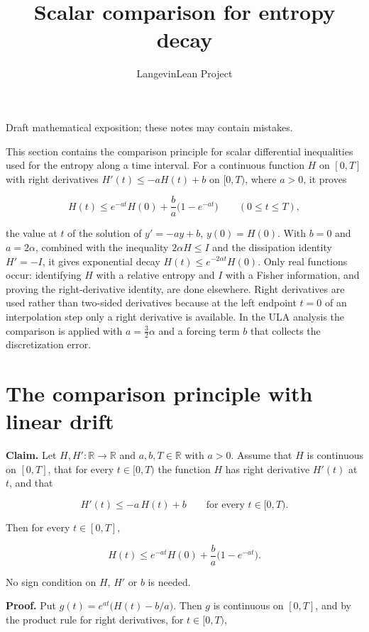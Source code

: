 \documentclass[11pt,a4paper]{article}
\title{\texorpdfstring{Scalar comparison for entropy decay}{Scalar comparison for entropy decay}}
\author{LangevinLean Project}
\date{}
\begin{document}
\maketitle
Draft mathematical exposition; these notes may contain mistakes.


This section contains the comparison principle for scalar differential inequalities used for the entropy along a time interval. For a continuous function \(H\) on \([0,T]\) with right derivatives \(H'(t)\le-aH(t)+b\) on \([0,T)\), where \(a>0\), it proves


\[H(t)\le e^{-at}H(0)+\frac ba\bigl(1-e^{-at}\bigr)\qquad(0\le t\le T),\]


the value at \(t\) of the solution of \(y'=-ay+b\), \(y(0)=H(0)\). With \(b=0\) and \(a=2\alpha\), combined with the inequality \(2\alpha H\le I\) and the dissipation identity \(H'=-I\), it gives exponential decay \(H(t)\le e^{-2\alpha t}H(0)\). Only real functions occur: identifying \(H\) with a relative entropy and \(I\) with a Fisher information, and proving the right-derivative identity, are done elsewhere. Right derivatives are used rather than two-sided derivatives because at the left endpoint \(t=0\) of an interpolation step only a right derivative is available. In the ULA analysis the comparison is applied with \(a=\frac32\alpha\) and a forcing term \(b\) that collects the discretization error.


\section{\texorpdfstring{The comparison principle with linear drift}{The comparison principle with linear drift}}


\textbf{Claim.} Let \(H,H':\mathbb R\to\mathbb R\) and \(a,b,T\in\mathbb R\) with \(a>0\). Assume that \(H\) is continuous on \([0,T]\), that for every \(t\in[0,T)\) the function \(H\) has right derivative \(H'(t)\) at \(t\), and that


\[H'(t)\le-a\,H(t)+b\qquad\text{for every }t\in[0,T).\]


Then for every \(t\in[0,T]\),


\[H(t)\le e^{-at}H(0)+\frac ba\bigl(1-e^{-at}\bigr).\]


No sign condition on \(H\), \(H'\) or \(b\) is needed.




\textbf{Proof.} Put \(g(t)=e^{at}\bigl(H(t)-b/a\bigr)\). Then \(g\) is continuous on \([0,T]\), and by the product rule for right derivatives, for \(t\in[0,T)\),
\end{document}

